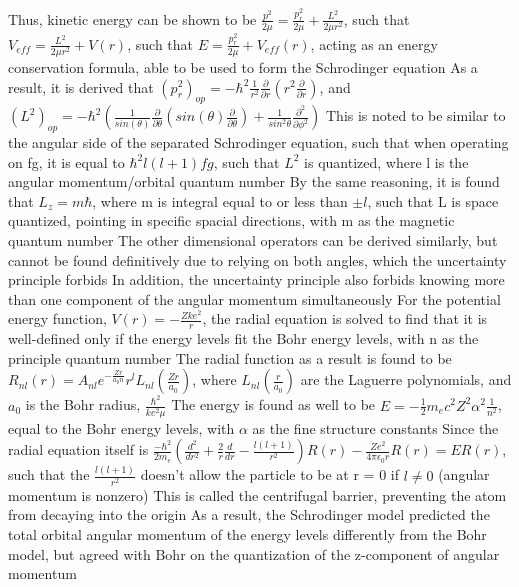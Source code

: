 \documentclass[11 pt, twoside]{article}
\newenvironment{outline*}
{
	\begin{outline}[enumerate]
	}
	{\end{outline}
}
\begin{document}
\begin{outline*}
		\3 Thus, kinetic energy can be shown to be $\frac{p^2}{2\mu} = \frac{p_r^2}{2\mu} + \frac{L^2}{2\mu r^2}$, such that $V_{eff} = \frac{L^2}{2\mu r^2} + V(r)$, such that $E = \frac{p_r^2}{2\mu} + V_{eff}(r)$, acting as an energy conservation formula, able to be used to form the Schrodinger equation
		\3 As a result, it is derived that $(p_r^2)_{op} = -\hbar^2 \frac{1}{r^2}\frac{\partial}{\partial r}(r^2 \frac{\partial}{\partial r})$, and $(L^2)_{op} = -\hbar^2(\frac{1}{sin(\theta)}\frac{\partial}{\partial \theta}(sin(\theta)\frac{\partial}{\partial \theta}) + \frac{1}{sin^2\theta}\frac{\partial^2}{\partial \phi^2})$
			\4 This is noted to be similar to the angular side of the separated Schrodinger equation, such that when operating on fg, it is equal to $\hbar^2l(l + 1)fg$, such that $L^2$ is quantized, where l is the angular momentum/orbital quantum number
			\4 By the same reasoning, it is found that $L_z = m\hbar$, where m is integral equal to or less than $\pm l$, such that L is space quantized, pointing in specific spacial directions, with m as the magnetic quantum number
		\3 The other dimensional operators can be derived similarly, but cannot be found definitively due to relying on both angles, which the uncertainty principle forbids
			\4 In addition, the uncertainty principle also forbids knowing more than one component of the angular momentum simultaneously
	\2 For the potential energy function, $V(r) = -\frac{Zke^2}{r}$, the radial equation is solved to find that it is well-defined only if the energy levels fit the Bohr energy levels, with n as the principle quantum number
		\3 The radial function as a result is found to be $R_{nl}(r) = A_{nl}e^{-\frac{Zr}{a_0n}}r^lL_{nl}(\frac{Zr}{a_0})$, where $L_{nl}(\frac{r}{a_0})$ are the Laguerre polynomials, and $a_0$ is the Bohr radius, $\frac{\hbar^2}{ke^2\mu}$
		\3 The energy is found as well to be $E = -\frac{1}{2}m_ec^2Z^2\alpha^2\frac{1}{n^2}$, equal to the Bohr energy levels, with $\alpha$ as the fine structure constants
		\3 Since the radial equation itself is $\frac{-\hbar^2}{2m_e}(\frac{d^2}{dr^2} + \frac{2}{r}\frac{d}{dr} - \frac{l(l+1)}{r^2})R(r) - \frac{Ze^2}{4\pi \epsilon_0 r}R(r) = ER(r)$, such that the $\frac{l(l + 1)}{r^2}$ doesn't allow the particle to be at r = 0 if $l \neq 0$ (angular momentum is nonzero)
			\4 This is called the centrifugal barrier, preventing the atom from decaying into the origin
	\2 As a result, the Schrodinger model predicted the total orbital angular momentum of the energy levels differently from the Bohr model, but agreed with Bohr on the quantization of the z-component of angular momentum

\end{outline*}
\end{document}
